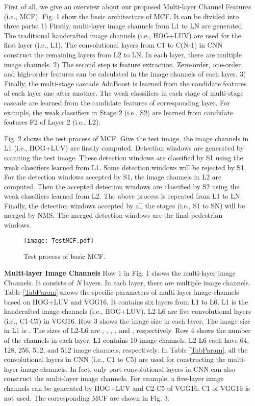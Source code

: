 \documentclass[journal]{IEEEtran}
\begin{document}
First of all, we give an overview about our proposed Multi-layer Channel Features (i.e., MCF). Fig. 1 show the basic architecture of MCF. It can be divided into three parts: 1) Firstly, multi-layer image channels from L1 to LN are generated. The traditional handcrafted image channels (i.e., HOG+LUV) are used for the first layer (i.e., L1). The convolutional layers from C1 to C(N-1) in CNN construct the remaining layers from L2 to LN. In each layer, there are multiple image channels. 2) The second step is feature extraction. Zero-order, one-order, and high-order features can be calculated in the image channels of each layer. 3) Finally, the multi-stage cascade AdaBoost is learned from the candidate features of each layer one after another. The weak classifiers in each stage of multi-stage cascade are learned from the candidate features of corresponding layer. For example, the weak classifiers in Stage 2 (i.e., S2) are learned from candidate features F2 of Layer 2 (i.e., L2).

Fig. 2 shows the test process of MCF. Give the test image, the image channels in L1 (i.e., HOG+LUV) are firstly computed. Detection windows are generated by scanning the test image. These detection windows are classified by S1 using the weak classifiers learned from L1. Some detection windows will be rejected by S1. For the detection windows accepted by S1, the image channels in L2 are computed. Then the accepted detection windows are classified by S2 using the weak classifiers learned from L2. The above process is repeated from L1 to LN. Finally, the detection windows accepted by all the stages (i.e., S1 to SN) will be merged by NMS. The merged detection windows are the final pedestrian windows.

\begin{figure}[!t]
\label{TestMCF}
\centering
\texttt{[image: TestMCF.pdf]}
\caption{Test process of basic MCF.} 
\end{figure}


\textbf{Multi-layer Image Channels} Row 1 in Fig. 1 shows the multi-layer image Channels. It consists of \textit{N} layers. In each layer, there are multiple image channels. Table \ref{TabParam} shows the specific parameters of multi-layer image channels based on HOG+LUV and VGG16. It contains six layers from L1 to L6. L1 is the handcrafted image channels (i.e., HOG+LUV). L2-L6 are five convolutional layers (i.e., C1-C5) in VGG16. Row 3 shows the image size in each layer. The image size in L1 is . The sizes of L2-L6 are , , , , and , respectively. Row 4 shows the number of the channels in each layer. L1 contains 10 image channels. L2-L6 each have 64, 128, 256, 512, and 512 image channels, respectively. In Table \ref{TabParam}, all the convolutional layers in CNN (i.e., C1 to C5) are used for constructing the multi-layer image channels. In fact, only part convolutional layers in CNN can also construct the multi-layer image channels. For example, a five-layer image channels can be generated by HOG+LUV and C2-C5 of VGG16. C1 of VGG16 is not used.  The corresponding MCF are shown in Fig. 3.
\end{document}
